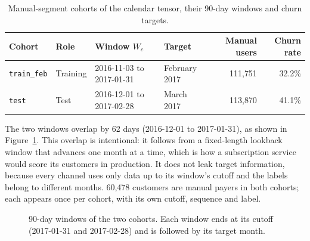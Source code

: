 \documentclass{article}
\begin{document}
\begin{table}[H]
\centering
\renewcommand{\arraystretch}{1.3}
\begin{tabular}{|l|l|l|l|r|r|}
\hline
\textbf{Cohort} & \textbf{Role} & \textbf{Window $W_c$} & \textbf{Target} & \textbf{Manual users} & \textbf{Churn rate} \\ \hline
\texttt{train\_feb} & Training & 2016-11-03 to 2017-01-31 & February 2017 & 111{,}751 & 32.2\% \\ \hline
\texttt{test}       & Test     & 2016-12-01 to 2017-02-28 & March 2017    & 113{,}870 & 41.1\% \\ \hline
\end{tabular}
\caption{Manual-segment cohorts of the calendar tensor, their 90-day windows and churn targets.}
\label{tab:w2_cohorts}
\end{table}

The two windows overlap by 62 days (2016-12-01 to 2017-01-31), as shown in Figure~\ref{fig:w2_overlap}. This overlap is intentional: it follows from a fixed-length lookback window that advances one month at a time, which is how a subscription service would score its customers in production. It does not leak target information, because every channel uses only data up to its window's cutoff and the labels belong to different months. 60{,}478 customers are manual payers in both cohorts; each appears once per cohort, with its own cutoff, sequence and label.

\begin{figure}[H]
\centering
{}
\caption{90-day windows of the two cohorts. Each window ends at its cutoff (2017-01-31 and 2017-02-28) and is followed by its target month.}
\label{fig:w2_overlap}
\end{figure}
\end{document}
